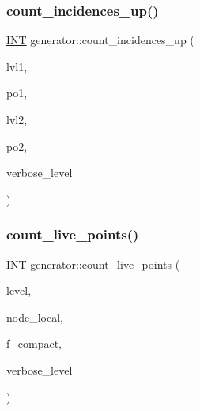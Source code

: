 \mbox{\label{classgenerator_a9d833d8494072c07de28b8f0e9b8155d}} 
\subsubsection{\texorpdfstring{count\+\_\+incidences\+\_\+up()}{count\_incidences\_up()}}
{\footnotesize\ttfamily \mbox{\hyperlink{galois_8h_a09fddde158a3a20bd2dcadb609de11dc}{I\+NT}} generator\+::count\+\_\+incidences\+\_\+up (\begin{DoxyParamCaption}\item[{\mbox{\hyperlink{galois_8h_a09fddde158a3a20bd2dcadb609de11dc}{I\+NT}}}]{lvl1,  }\item[{\mbox{\hyperlink{galois_8h_a09fddde158a3a20bd2dcadb609de11dc}{I\+NT}}}]{po1,  }\item[{\mbox{\hyperlink{galois_8h_a09fddde158a3a20bd2dcadb609de11dc}{I\+NT}}}]{lvl2,  }\item[{\mbox{\hyperlink{galois_8h_a09fddde158a3a20bd2dcadb609de11dc}{I\+NT}}}]{po2,  }\item[{\mbox{\hyperlink{galois_8h_a09fddde158a3a20bd2dcadb609de11dc}{I\+NT}}}]{verbose\+\_\+level }\end{DoxyParamCaption})}

\mbox{\label{classgenerator_a69c137b9ff2a32106eaaee315dee28ce}} 
\subsubsection{\texorpdfstring{count\+\_\+live\+\_\+points()}{count\_live\_points()}}
{\footnotesize\ttfamily \mbox{\hyperlink{galois_8h_a09fddde158a3a20bd2dcadb609de11dc}{I\+NT}} generator\+::count\+\_\+live\+\_\+points (\begin{DoxyParamCaption}\item[{\mbox{\hyperlink{galois_8h_a09fddde158a3a20bd2dcadb609de11dc}{I\+NT}}}]{level,  }\item[{\mbox{\hyperlink{galois_8h_a09fddde158a3a20bd2dcadb609de11dc}{I\+NT}}}]{node\+\_\+local,  }\item[{\mbox{\hyperlink{galois_8h_a09fddde158a3a20bd2dcadb609de11dc}{I\+NT}}}]{f\+\_\+compact,  }\item[{\mbox{\hyperlink{galois_8h_a09fddde158a3a20bd2dcadb609de11dc}{I\+NT}}}]{verbose\+\_\+level }\end{DoxyParamCaption})}

